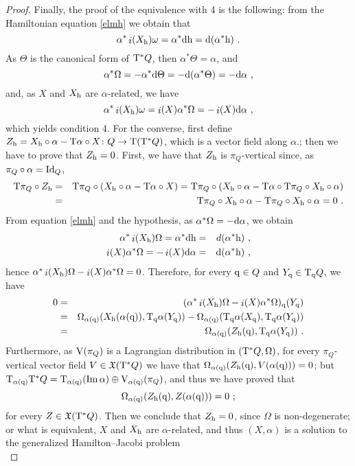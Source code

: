 \documentclass[12pt]{report}
\def\beq{\begin{equation}}
\def\eeq{\end{equation}}
\def\beann{\begin{eqnarray*}}
\def\eeann{\end{eqnarray*}}
\def\qed{\ifvmode\removelastskip\fi
{\unskip\nobreak\hfil\penalty50\hbox{}\nobreak\hfil
\hbox{\vrule height1.2ex width1.2ex}\parfillskip=0pt
\finalhyphendemerits=0 \par\smallskip}}
\def\vf{\mathfrak X}
\def\d{{\rm d}}
\def\Tan{{\rm T}}
\def\inn{\mathop{i}\nolimits}
\begin{document}
\begin{proof}
Finally, the proof of the equivalence with 4 is the following:
from the Hamiltonian equation \eqref{elmh} we obtain that
$$
\alpha^*\inn(X_{\rm h})\omega=\alpha^*\d{\rm h}=\d(\alpha^*{\rm h}) \ .
$$
As $\Theta$ is the canonical form of $\Tan^*Q$, then
$\alpha^*\Theta=\alpha$, and
\beq
\alpha^*\Omega = -\alpha^*\d\Theta=-\d(\alpha^*\Theta)=-\d\alpha \ ,
\label{00}
\eeq
and, as $X$ and $X_{\rm h}$ are $\alpha$-related, we have
$$
\alpha^*\inn(X_{\rm h})\omega=\inn(X)\alpha^*\Omega=-\inn(X)\d\alpha
\ ,
$$
which yields condition 4. 
For the converse, first define
$Z_{\rm h}=X_{\rm h}\circ\alpha-\Tan\alpha\circ X\colon Q\to \Tan(\Tan^*Q)$,
which is a vector field along $\alpha$.;
then we have to prove that $Z_{\rm h}=0$.
First, we have that $Z_{\rm h}$ is $\pi_Q$-vertical since,
as $\pi_Q\circ\alpha={\rm Id}_Q$,
\beann
\Tan\pi_Q\circ Z_{\rm h} &=& \Tan\pi_Q\circ(X_{\rm h}\circ\alpha-\Tan\alpha\circ X)=
\Tan\pi_Q\circ(X_{\rm h}\circ\alpha-\Tan\alpha\circ\Tan\pi_Q\circ X_{\rm h}\circ\alpha)
\\ &=&
\Tan\pi_Q\circ X_{\rm h}\circ\alpha-\Tan\pi_Q\circ X_{\rm h}\circ\alpha=0 \ .
\eeann
From equation \eqref{elmh}
and the hypothesis, as $\alpha^*\Omega=-\d\alpha$, we obtain
\beann
\alpha^*\inn(X_{\rm h})\Omega = \alpha^*\d{\rm h} &=& d(\alpha^*{\rm h})
\ ,
\\
\inn(X)\alpha^*\Omega=-\inn(X)\d\alpha &=& \d(\alpha^*{\rm h}) \ ,
\eeann
hence $\alpha^*\inn(X_{\rm h})\Omega-\inn(X)\alpha^*\Omega=0$.
Therefore, for every ${\rm q}\in Q$ and $Y_{\rm q}\in\Tan_{\rm q}Q$, we have
\beann
0 &=& (\alpha^*\inn(X_{\rm h})\Omega-\inn(X)\alpha^*\Omega)_{\rm q}(Y_{\rm q})\\
&=&\Omega_{\alpha({\rm q})}(X_{\rm h}(\alpha({\rm q})),\Tan_{\rm q}\alpha(Y_{\rm q}))-
\Omega_{\alpha({\rm q})}(\Tan_{\rm q}\alpha(X_{\rm q}),\Tan_{\rm q}\alpha(Y_{\rm q}))
\\
&=& \Omega_{\alpha({\rm q})}(Z_{\rm h}({\rm q}),\Tan_{\rm q}\alpha(Y_{\rm q})) \ .
\eeann
Furthermore, as ${\rm V}(\pi_Q)$ is a Lagrangian distribution in 
$(\Tan^*Q,\Omega)$, for every $\pi_Q$-vertical vector field $V\in\vf(\Tan^*Q)$ 
we have that
$\Omega_{\alpha({\rm q})}(Z_{\rm h}({\rm q}),V(\alpha({\rm q})))=0$;
but $\Tan_{\alpha({\rm q})}\Tan^*Q=
\Tan_{\alpha({\rm q})}({\rm Im}\,\alpha)\oplus{\rm V}_{\alpha({\rm q})}(\pi_Q)$,
and thus we have proved that
$$
\Omega_{\alpha({\rm q})}(Z_{\rm h}({\rm q}),Z(\alpha({\rm q})))=0 \ ;
$$
for every $Z\in\vf(\Tan^*Q)$. Then we conclude that $Z_{\rm h}=0$,
since $\Omega$ is non-degenerate;
or what is equivalent,
$X$ and $X_{\rm h}$ are $\alpha$-related, and thus
$(X,\alpha)$ is a solution to the generalized Hamilton--Jacobi problem
\\ \qed \end{proof}
\end{document}
